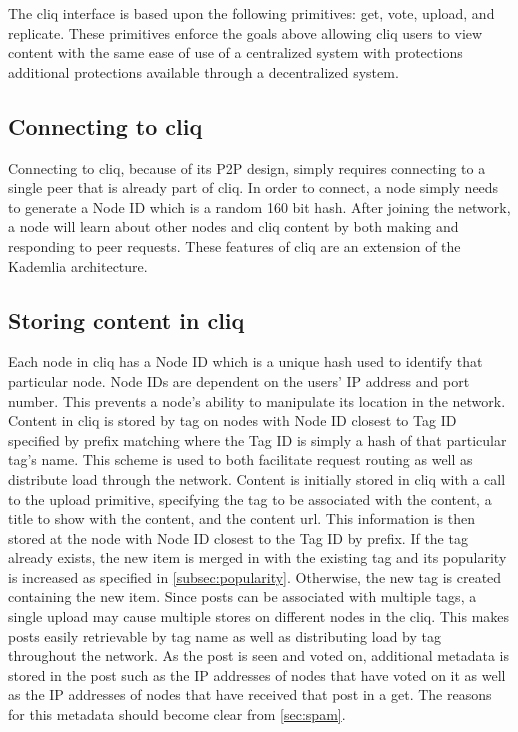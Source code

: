 \documentclass{sig-alternate}
\begin{document}
The cliq interface is based upon the following primitives: get, vote, upload, and replicate. 
These primitives enforce the goals above allowing cliq users to view content with the same ease of use of a centralized system with protections additional protections available through a decentralized system. 

\subsection{Connecting to cliq}

Connecting to cliq, because of its P2P design, simply requires connecting to a single peer that is already part of cliq. 
In order to connect, a node simply needs to generate a Node ID which is a random 160 bit hash. 
After joining the network, a node will learn about other nodes and cliq content by both making and responding to peer requests. 
These features of cliq are an extension of the Kademlia architecture.

\subsection{Storing content in cliq}
\label{subsec:upload}

Each node in cliq has a Node ID which is a unique hash used to identify that particular node. Node IDs are dependent on the users' IP address and port number. This prevents a node's ability to manipulate its location in the network.   
Content in cliq is stored by tag on nodes with Node ID closest to Tag ID specified by prefix matching where the Tag ID is simply a hash of that particular tag's name. 
This scheme is used to both facilitate request routing as well as distribute load through the network. 
Content is initially stored in cliq with a call to the upload primitive, specifying the tag to be associated with the content, a title to show with the content, and the content url. 
This information is then stored at the node with Node ID closest to the Tag ID by prefix. 
If the tag already exists, the new item is merged in with the existing tag and its popularity is increased as specified in \ref{subsec:popularity}. 
Otherwise, the new tag is created containing the new item. 
Since posts can be associated with multiple tags, a single upload may cause multiple stores on different nodes in the cliq. 
This makes posts easily retrievable by tag name as well as distributing load by tag throughout the network. 
As the post is seen and voted on, additional metadata is stored in the post such as the IP addresses of nodes that have voted on it as well as the IP addresses of nodes that have received that post in a get. 
The reasons for this metadata should become clear from \ref{sec:spam}. 
\end{document}
